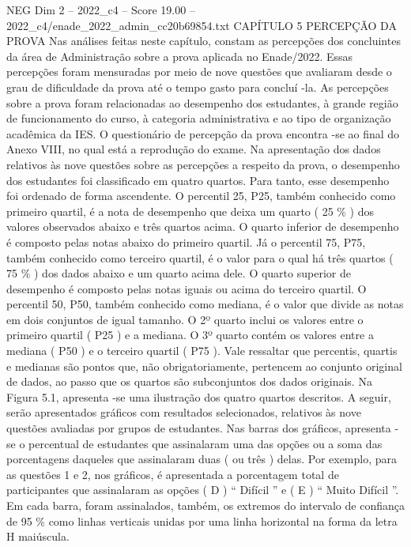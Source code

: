 \begin{textsample}{NEG Dim 2 – 2022\_c4 – Score 19.00 – 2022\_c4/enade\_2022\_admin\_cc20b69854.txt}  \label{ex:f2_neg_410}
CAPÍTULO 5 PERCEPÇÃO DA PROVA Nas análises feitas neste capítulo, constam as percepções dos concluintes da área de Administração sobre a prova aplicada no Enade/2022.
Essas percepções foram mensuradas por meio de nove questões que avaliaram desde o grau de dificuldade da prova até o tempo gasto para concluí -la.
As percepções sobre a prova foram relacionadas ao desempenho dos estudantes, à grande região de funcionamento do curso, à categoria administrativa e ao tipo de organização acadêmica da IES.
O questionário de percepção da prova encontra -se ao final do Anexo VIII, no qual está a reprodução do exame.
Na apresentação dos dados relativos às nove questões sobre as percepções a respeito da prova, o desempenho dos estudantes foi classificado em quatro quartos.
Para tanto, esse desempenho foi ordenado de forma ascendente.
O percentil 25, P25, também conhecido como primeiro quartil, é a nota de desempenho que deixa um quarto ( 25 \% ) dos valores observados abaixo e três quartos acima.
O quarto inferior de desempenho é composto pelas notas abaixo do primeiro quartil.
Já o percentil 75, P75, também conhecido como terceiro quartil, é o valor para o qual há três quartos ( 75 \% ) dos dados abaixo e um quarto acima dele.
O quarto superior de desempenho é composto pelas notas iguais ou acima do terceiro quartil.
O percentil 50, P50, também conhecido como mediana, é o valor que divide as notas em dois conjuntos de igual tamanho.
O 2º quarto inclui os valores entre o primeiro quartil ( P25 ) e a mediana.
O 3º quarto contém os valores entre a mediana ( P50 ) e o terceiro quartil ( P75 ).
Vale ressaltar que percentis, quartis e medianas são pontos que, não obrigatoriamente, pertencem ao conjunto original de dados, ao passo que os quartos são subconjuntos dos dados originais.
Na Figura 5.1, apresenta -se uma ilustração dos quatro quartos descritos.
A seguir, serão apresentados gráficos com resultados selecionados, relativos às nove questões avaliadas por grupos de estudantes.
Nas barras dos gráficos, apresenta -se o percentual de estudantes que assinalaram uma das opções ou a soma das porcentagens daqueles que assinalaram duas ( ou três ) delas.
Por exemplo, para as questões 1 e 2, nos gráficos, é apresentada a porcentagem total de participantes que assinalaram as opções ( D ) “ Difícil ” e ( E ) “ Muito Difícil ”.
Em cada barra, foram assinalados, também, os extremos do intervalo de confiança de 95 \% como linhas verticais unidas por uma linha horizontal na forma da letra H maiúscula.

\end{textsample}
